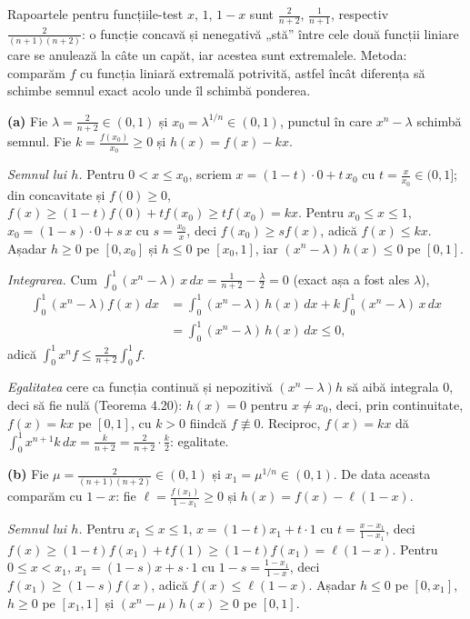 Rapoartele pentru funcțiile-test $x$, $1$, $1-x$ sunt $\frac{2}{n+2}$, $\frac{1}{n+1}$, respectiv $\frac{2}{(n+1)(n+2)}$: o funcție concavă și nenegativă „stă'' între cele două funcții liniare care se anulează la câte un capăt, iar acestea sunt extremalele. Metoda: comparăm $f$ cu funcția liniară extremală potrivită, astfel încât diferența să schimbe semnul exact acolo unde îl schimbă ponderea.

\noindent\textbf{(a)} Fie $\lambda=\frac{2}{n+2}\in(0,1)$ și $x_{0}=\lambda^{1/n}\in(0,1)$, punctul în care $x^{n}-\lambda$ schimbă semnul. Fie $k=\frac{f(x_{0})}{x_{0}}\ge0$ și $h(x)=f(x)-kx$.

\emph{Semnul lui $h$.} Pentru $0<x\le x_{0}$, scriem $x=(1-t)\cdot0+t\,x_{0}$ cu $t=\frac{x}{x_{0}}\in(0,1]$; din concavitate și $f(0)\ge0$, $f(x)\ge(1-t)f(0)+tf(x_{0})\ge t f(x_{0})=kx$. Pentru $x_{0}\le x\le1$, $x_{0}=(1-s)\cdot0+s\,x$ cu $s=\frac{x_{0}}{x}$, deci $f(x_{0})\ge s f(x)$, adică $f(x)\le kx$. Așadar $h\ge0$ pe $[0,x_{0}]$ și $h\le0$ pe $[x_{0},1]$, iar $(x^{n}-\lambda)\,h(x)\le0$ pe $[0,1]$.

\emph{Integrarea.} Cum $\int_0^1(x^{n}-\lambda)\,x\,dx=\frac{1}{n+2}-\frac{\lambda}{2}=0$ (exact așa a fost ales $\lambda$),
\[ \begin{aligned} \int_0^1(x^{n}-\lambda)f(x)\,dx&=\int_0^1(x^{n}-\lambda)\,h(x)\,dx+k\int_0^1(x^{n}-\lambda)\,x\,dx\\ &=\int_0^1(x^{n}-\lambda)\,h(x)\,dx\le0 , \end{aligned} \]
adică $\int_0^1x^{n}f\le\frac{2}{n+2}\int_0^1f$.

\emph{Egalitatea} cere ca funcția continuă și nepozitivă $(x^{n}-\lambda)h$ să aibă integrala $0$, deci să fie nulă (Teorema 4.20): $h(x)=0$ pentru $x\neq x_{0}$, deci, prin continuitate, $f(x)=kx$ pe $[0,1]$, cu $k>0$ fiindcă $f\not\equiv0$. Reciproc, $f(x)=kx$ dă $\int_0^1x^{n+1}k\,dx=\frac{k}{n+2}=\frac{2}{n+2}\cdot\frac k2$: egalitate.

\noindent\textbf{(b)} Fie $\mu=\frac{2}{(n+1)(n+2)}\in(0,1)$ și $x_{1}=\mu^{1/n}\in(0,1)$. De data aceasta comparăm cu $1-x$: fie $\ell=\frac{f(x_{1})}{1-x_{1}}\ge0$ și $h(x)=f(x)-\ell(1-x)$.

\emph{Semnul lui $h$.} Pentru $x_{1}\le x\le1$, $x=(1-t)x_{1}+t\cdot1$ cu $t=\frac{x-x_{1}}{1-x_{1}}$, deci $f(x)\ge(1-t)f(x_{1})+tf(1)\ge(1-t)f(x_{1})=\ell(1-x)$. Pentru $0\le x<x_{1}$, $x_{1}=(1-s)x+s\cdot1$ cu $1-s=\frac{1-x_{1}}{1-x}$, deci $f(x_{1})\ge(1-s)f(x)$, adică $f(x)\le\ell(1-x)$. Așadar $h\le0$ pe $[0,x_{1}]$, $h\ge0$ pe $[x_{1},1]$ și $(x^{n}-\mu)\,h(x)\ge0$ pe $[0,1]$.

